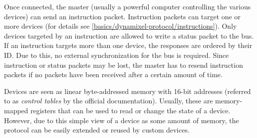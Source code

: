 Once connected, the master (usually a powerful computer controlling the various devices) can send an
instruction packet. Instruction packets can target one or more devices (for details see
\ref{basics/dynamixel-protocol/instructions}). Only devices targeted by an instruction are allowed to
write a status packet to the bus. If an instruction targets more than one device, the responses are
ordered by their ID. Due to this, no external synchronization for the bus is required. Since instruction
or status packets may be lost, the master has to resend instruction packets if no packets have been
received after a certain amount of time.

Devices are seen as linear byte-addressed memory with 16-bit addresses (referred to as \textit{control tables}
by the official documentation). Usually, these are memory-mapped registers that can be used to read or change
the state of a device. However, due to this simple view of a device as some amount of memory, the protocol can
be easily extended or reused by custom devices.


